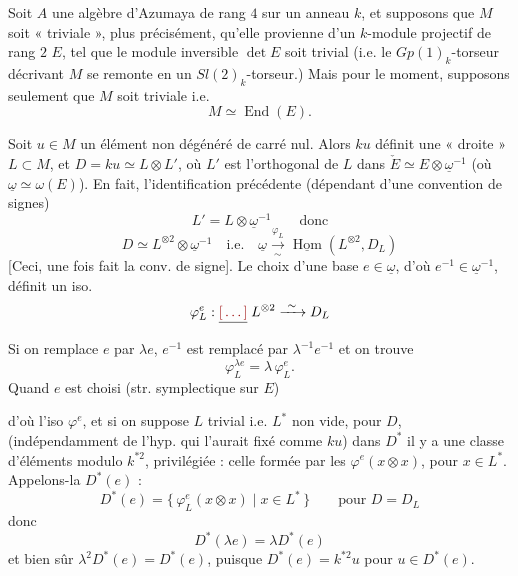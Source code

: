 \documentclass[11pt,a4paper]{article}
\begin{document}

Soit $A$ une algèbre d'Azumaya de rang $4$ sur un anneau $k$, et supposons que $M$ soit « triviale », plus précisément, qu'elle provienne d'un $k$-module projectif de rang $2$ $E$, tel que le module inversible $\det E$ soit trivial (i.e. le  $Gp(1)_k$-torseur décrivant $M$  se remonte en un $Sl(2)_k$-torseur.) Mais pour le moment, supposons seulement que $M$ soit triviale i.e.
\[
  M \simeq \operatorname{End}(E) .
\]

Soit $u\in M$ un élément non dégénéré de carré nul. Alors $ku$ définit une « droite » $L\subset M$, et $D = ku \simeq L\otimes L'$, où $L'$ est l'orthogonal de $L$ dans $\check{E} \simeq E\otimes \underline{\omega}^{-1}$ (où $\underline{\omega} \simeq \omega(E)$).
 En fait, \ill{} l'identification précédente (dépendant d'une convention de signes) \ill{}
\[
  L' = L\otimes \underline{\omega}^{-1} \qquad\text{donc}
\]
\[
  D \simeq L^{\otimes 2}\otimes\underline{\omega}^{-1}
  \quad\text{i.e.}\quad
  \underline{\omega} \xrightarrow[\sim]{\varphi_L} \underline{\operatorname{Hom}}(L^{\otimes 2}, D_L)
\]
[Ceci, une fois fait la conv. de signe].
Le choix d'une base $e\in\underline{\omega}$, d'où $e^{-1}\in\underline{\omega}^{-1}$, définit un iso.
\[
  \varphi_L^e : \struck{\ill{}} \; L^{\otimes 2} \xrightarrow{\ \sim\ } D_L
\]
Si on remplace $e$ par $\lambda e$, $e^{-1}$ est remplacé par $\lambda^{-1}e^{-1}$ et on trouve
\[
  \varphi_L^{\lambda e} = \lambda\, \varphi_L^{e} .
\]
Quand $e$ est choisi (str. symplectique sur $E$)

d'où l'iso $\varphi^e$, et si on suppose $L$ trivial i.e. $L^*$ non vide,   pour $D$, (indépendamment  de l'hyp. qui l'aurait fixé comme \ill{} \ill{} $ku$) dans $D^*$ il y a une classe d'éléments modulo $k^{*2}$, privilégiée : celle formée par les $\varphi^e(x\otimes x)$, pour $x\in L^*$. Appelons-la $D^*(e)$ : 
\[
  D^*(e) = \{\, \varphi_L^e(x\otimes x) \mid x\in L^* \,\} \qquad\text{pour } D = D_L
\]
donc
\[
  D^*(\lambda e) = \lambda D^*(e)
\]
et bien sûr $\lambda^2 D^*(e) = D^*(e)$, puisque $D^*(e) = k^{*2}u$ pour $u\in D^*(e)$.
\end{document}

